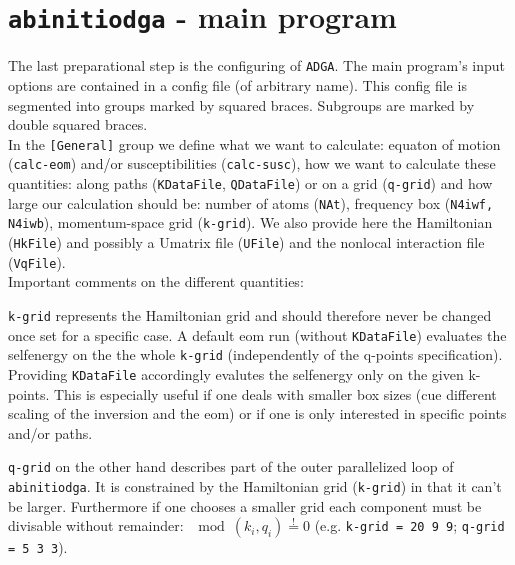 \documentclass[a4paper,11pt]{article}
\numberwithin{equation}{section} %
\begin{document}
\newpage
\section{\protect\Verb+abinitiodga+ - main program}
The last preparational step is the configuring of \verb+ADGA+.
The main program's input options are contained in a config file (of arbitrary name).
This config file is segmented into groups marked by squared braces.
Subgroups are marked by double squared braces.
\\[\baselineskip]
In the {\color{red} \verb|[General]|} group we define what we want to calculate: equaton of motion (\verb+calc-eom+) and/or susceptibilities (\verb+calc-susc+), how we want to calculate these quantities: along paths (\verb+KDataFile+, \verb+QDataFile+) or on a grid (\verb+q-grid+)
and how large our calculation should be: number of atoms (\verb+NAt+), frequency box (\verb+N4iwf, N4iwb+), momentum-space grid (\verb+k-grid+). We also provide here the Hamiltonian (\verb+HkFile+) and possibly a Umatrix file (\verb+UFile+) and the nonlocal interaction file (\verb+VqFile+).
\\[\baselineskip]
Important comments on the different quantities:

\verb+k-grid+ represents the Hamiltonian grid and should therefore never be changed once set for a specific case.
A default eom run (without \verb+KDataFile+) evaluates the selfenergy on the the whole \verb+k-grid+ (independently of the q-points specification).
Providing \verb+KDataFile+ accordingly evalutes the selfenergy only on the given k-points.
This is especially useful if one deals with smaller box sizes (cue different scaling of the inversion and the eom) or if one is only interested in specific points and/or paths.

\verb+q-grid+ on the other hand describes part of the outer parallelized loop of \verb+abinitiodga+.
It is constrained by the Hamiltonian grid (\verb+k-grid+) in that it can't be larger.
Furthermore if one chooses a smaller grid each component must be divisable without remainder: $\mod(k_i, q_i) \stackrel{!}{=} 0$ (e.g. \verb+k-grid = 20 9 9+; \verb+q-grid = 5 3 3+).
\end{document}
